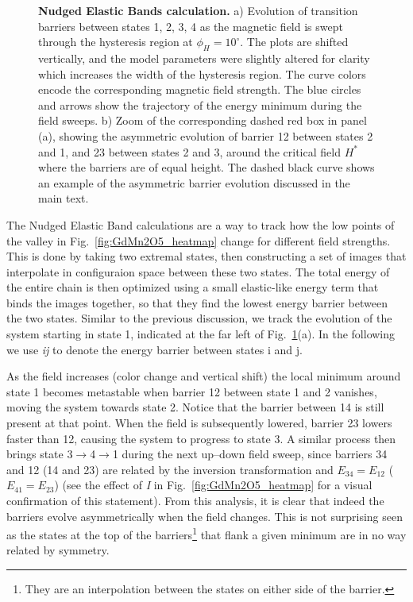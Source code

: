 \begin{figure}[h]
    \caption{\label{fig:GdMn2O5_neb}{\bf Nudged Elastic Bands calculation.}
    a) Evolution of transition barriers between states 1, 2, 3, 4 as the magnetic field is swept through the hysteresis region at $\phi_H = 10^\circ$. The plots are shifted vertically, and the model parameters were slightly altered for clarity which increases the width of the hysteresis region. The curve colors encode the corresponding magnetic field strength. The blue circles and arrows show the trajectory of the energy minimum during the field sweeps.
    b) Zoom of the corresponding dashed red box in panel (a), showing the asymmetric evolution of barrier 12 between states 2 and 1, and 23 between states 2 and 3, around the critical field $H^\ast$ where the barriers are of equal height. The dashed black curve shows an example of the asymmetric barrier evolution discussed in the main text.
    }
\end{figure}
%
The Nudged Elastic Band calculations are a way to track how the low points of the valley in Fig.~\ref{fig:GdMn2O5_heatmap} change for different field strengths.
This is done by taking two extremal states, then constructing a set of images that interpolate in configuraion space between these two states. The total energy of the entire chain is then optimized using a small elastic-like energy term that binds the images together, so that they find the lowest energy barrier between the two states.  
Similar to the previous discussion, we track the evolution of the system starting in state 1, indicated at the far left of Fig.~\ref{fig:GdMn2O5_neb}(a).
In the following we use {\it ij} to denote the energy barrier between states i and j.

As the field increases (color change and vertical shift) the local minimum around state 1 becomes metastable when barrier 12 between state 1 and 2 vanishes, moving the system towards state 2.
Notice that the barrier between 14 is still present at that point.
When the field is subsequently lowered, barrier 23 lowers faster than 12, causing the system to progress to state 3.
A similar process then brings state 3$\rightarrow$4$\rightarrow$1 during the next up--down field sweep, since barriers 34 and 12  (14 and 23) are related by the inversion transformation and  $E_{34} = E_{12}$ ($E_{41} = E_{23}$) (see the effect of {\it I} in Fig.~\ref{fig:GdMn2O5_heatmap} for a visual confirmation of this statement).
From this analysis, it is clear that indeed the barriers evolve asymmetrically when the field changes.
This is not surprising seen as the states at the top of the barriers\footnote{They are an interpolation between the states on either side of the barrier.} that flank a given minimum are in no way related by symmetry.

